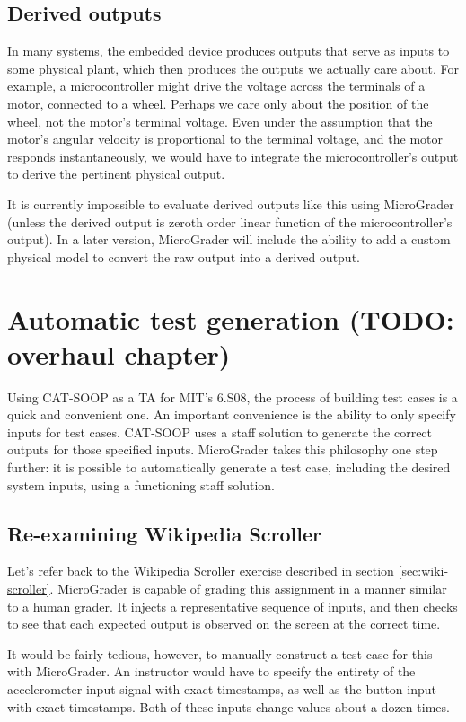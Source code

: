 \documentclass[12pt]{article}
\begin{document}
\subsection{Derived outputs}
\label{sec:derived-outputs}
In many systems, the embedded device produces outputs that serve as inputs to some physical plant, which then produces the outputs we actually care about.  For example, a microcontroller might drive the voltage across the terminals of a motor, connected to a wheel.  Perhaps we care only about the position of the wheel, not the motor's terminal voltage.  Even under the assumption that the motor's angular velocity is proportional to the terminal voltage, and the motor responds instantaneously, we would have to integrate the microcontroller's output to derive the pertinent physical output.

It is currently impossible to evaluate derived outputs like this using MicroGrader (unless the derived output is zeroth order linear function of the microcontroller's output).  In a later version, MicroGrader will include the ability to add a custom physical model to convert the raw output into a derived output.

\newpage
\section{Automatic test generation (TODO: overhaul chapter)}
\label{sec:scaffold}

Using CAT-SOOP as a TA for MIT's 6.S08, the process of building test cases is a quick and convenient one.  An important convenience is the ability to only specify inputs for test cases.  CAT-SOOP uses a staff solution to generate the correct outputs for those specified inputs.  MicroGrader takes this philosophy one step further: it is possible to automatically generate a test case, including the desired system inputs, using a functioning staff solution.

\subsection{Re-examining Wikipedia Scroller}
Let's refer back to the Wikipedia Scroller exercise described in section \ref{sec:wiki-scroller}.  MicroGrader is capable of grading this assignment in a manner similar to a human grader.  It injects a representative sequence of inputs, and then checks to see that each expected output is observed on the screen at the correct time.

It would be fairly tedious, however, to manually construct a test case for this with MicroGrader.  An instructor would have to specify the entirety of the accelerometer input signal with exact timestamps, as well as the button input with exact timestamps.  Both of these inputs change values about a dozen times.
\end{document}
